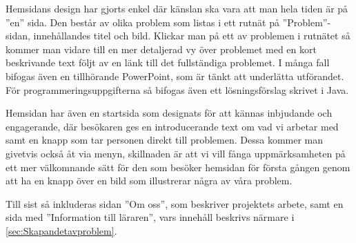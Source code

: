 \textcolor{Mahogany}{Hemsidans design har gjorts enkel där känslan ska vara att man hela tiden är på ''en'' sida. Den består av olika problem som listas i ett rutnät på ''Problem''-sidan, innehållandes titel och bild. Klickar man på ett av problemen i rutnätet så kommer man vidare till en mer detaljerad vy över problemet med en kort beskrivande text följt av en länk till det fullständiga problemet. I många fall bifogas även en tillhörande PowerPoint, som är tänkt att underlätta utförandet. För programmeringsuppgifterna så bifogas även ett lösningsförslag skrivet i Java.}

\textcolor{Mahogany}{Hemsidan har även en startsida som designats för att kännas inbjudande och engagerande, där besökaren ges en introducerande text om vad vi arbetar med samt en knapp som tar personen direkt till problemen. Dessa kommer man givetvis också åt via menyn, skillnaden är att vi vill fånga uppmärksamheten på ett mer välkomnande sätt för den som besöker hemsidan för första gången genom att ha en knapp över en bild som illustrerar några av våra problem.}

\textcolor{Mahogany}{Till sist så inkluderas sidan ''Om oss'', som beskriver projektets arbete, samt en sida med ''Information till läraren'', vars innehåll beskrivs närmare i \ref{sec:Skapandetavproblem}.}